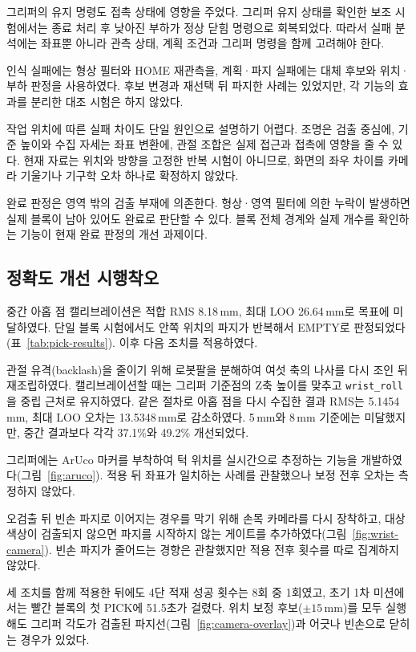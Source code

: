 그리퍼의 유지 명령도 접촉 상태에 영향을 주었다. 그리퍼 유지 상태를 확인한 보조 시험에서는 종료 처리 후 낮아진 부하가 정상 닫힘 명령으로 회복되었다. 따라서 실패 분석에는 좌표뿐 아니라 관측 상태, 계획 조건과 그리퍼 명령을 함께 고려해야 한다.

인식 실패에는 형상 필터와 HOME 재관측을, 계획·파지 실패에는 대체 후보와 위치·부하 판정을 사용하였다. 후보 변경과 재선택 뒤 파지한 사례는 있었지만, 각 기능의 효과를 분리한 대조 시험은 하지 않았다.

작업 위치에 따른 실패 차이도 단일 원인으로 설명하기 어렵다. 조명은 검출 중심에, 기준 높이와 수집 자세는 좌표 변환에, 관절 조합은 실제 접근과 접촉에 영향을 줄 수 있다. 현재 자료는 위치와 방향을 고정한 반복 시험이 아니므로, 화면의 좌우 차이를 카메라 기울기나 기구학 오차 하나로 확정하지 않았다.

완료 판정은 영역 밖의 검출 부재에 의존한다. 형상·영역 필터에 의한 누락이 발생하면 실제 블록이 남아 있어도 완료로 판단할 수 있다. 블록 전체 경계와 실제 개수를 확인하는 기능이 현재 완료 판정의 개선 과제이다.

\subsection{정확도 개선 시행착오}
\label{sec:accuracy-fixes}
중간 아홉 점 캘리브레이션은 적합 RMS 8.18\,mm, 최대 LOO 26.64\,mm로 목표에 미달하였다. 단일 블록 시험에서도 안쪽 위치의 파지가 반복해서 EMPTY로 판정되었다(표~\ref{tab:pick-results}). 이후 다음 조치를 적용하였다.

관절 유격(backlash)을 줄이기 위해 로봇팔을 분해하여 여섯 축의 나사를 다시 조인 뒤 재조립하였다. 캘리브레이션할 때는 그리퍼 기준점의 Z축 높이를 맞추고 \texttt{wrist\_roll}을 중립 근처로 유지하였다. 같은 절차로 아홉 점을 다시 수집한 결과 RMS는 5.1454\,mm, 최대 LOO 오차는 13.5348\,mm로 감소하였다. 5\,mm와 8\,mm 기준에는 미달했지만, 중간 결과보다 각각 37.1\%와 49.2\% 개선되었다.

그리퍼에는 ArUco 마커를 부착하여 턱 위치를 실시간으로 추정하는 기능을 개발하였다(그림~\ref{fig:aruco}). 적용 뒤 좌표가 일치하는 사례를 관찰했으나 보정 전후 오차는 측정하지 않았다.

오검출 뒤 빈손 파지로 이어지는 경우를 막기 위해 손목 카메라를 다시 장착하고, 대상 색상이 검출되지 않으면 파지를 시작하지 않는 게이트를 추가하였다(그림~\ref{fig:wrist-camera}). 빈손 파지가 줄어드는 경향은 관찰했지만 적용 전후 횟수를 따로 집계하지 않았다.

세 조치를 함께 적용한 뒤에도 4단 적재 성공 횟수는 8회 중 1회였고, 초기 1차 미션에서는 빨간 블록의 첫 PICK에 51.5초가 걸렸다. 위치 보정 후보($\pm15$\,mm)를 모두 실행해도 그리퍼 각도가 검출된 파지선(그림~\ref{fig:camera-overlay})과 어긋나 빈손으로 닫히는 경우가 있었다.

